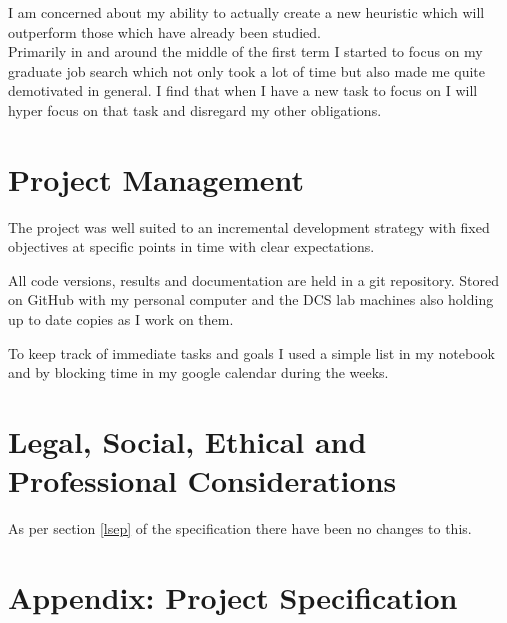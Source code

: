\documentclass{article}
\begin{document}
I am concerned about my ability to actually create a new heuristic which will outperform those which have already been studied.
\\

Primarily in and around the middle of the first term I started to focus on my graduate job search which not only took a lot of time but also made me quite demotivated in general.
I find that when I have a new task to focus on I will hyper focus on that task and disregard my other obligations.


\section{Project Management}


The project was well suited to an incremental development strategy with fixed objectives at specific points in time with clear expectations.

All code versions, results and documentation are held in a git repository.
Stored on GitHub with my personal computer and the DCS lab machines also holding up to date copies as I work on them.

To keep track of immediate tasks and goals I used a simple list in my notebook and by blocking time in my google calendar during the weeks.


\section{Legal, Social, Ethical and Professional Considerations}

As per section \ref{lsep} of the specification there have been no changes to this.

\newpage
\appendix

\section*{Appendix: Project Specification}
\end{document}
